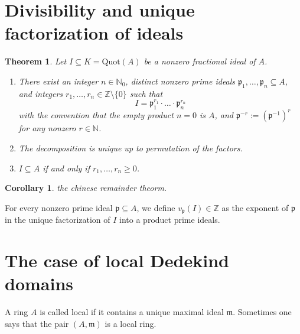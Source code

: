 \documentclass[a4paper]{book}
\theoremstyle{break}
\theoremstyle{plain}
\newtheorem{theorem}{Theorem}[definition]
\newtheorem{corollary}{Corollary}
\begin{document}
\section{Divisibility and unique factorization of ideals}

\begin{theorem}
    Let \(I \subseteq K = \text{Quot}(A)\) be a nonzero fractional ideal of \(A\).
    \begin{enumerate}
        \item There exist an integer \(n \in \mathbb{N}_0\), distinct nonzero prime ideals \(\mathfrak{p}_1, \ldots, \mathfrak{p}_n \subseteq A\), and integers \(r_1, \ldots, r_n \in \mathbb{Z} \setminus \{0\}\) such that
        \begin{equation}
            I = \mathfrak{p}_1^{r_1} \cdot \ldots \cdot \mathfrak{p}_n^{r_n}
        \end{equation}
        with the convention that the empty product \(n = 0\) is \(A\), and \(\mathfrak{p}^{-r} := \left(\mathfrak{p}^{-1}\right)^r\) for any nonzero \(r \in \mathbb{N}\).
        \item The decomposition is unique up to permutation of the factors.
        \item \(I \subseteq A\) if and only if \(r_1, \ldots, r_n \geq 0\).
    \end{enumerate}
\end{theorem}

\begin{corollary}
    the chinese remainder theorm.
\end{corollary}

\begin{definition}
    For every nonzero prime ideal \(\mathfrak{p} \subseteq A\), we define \(v_\mathfrak{p}(I) \in \mathbb{Z}\) as the exponent of \(\mathfrak{p}\) in the unique factorization of \(I\) into a product prime ideals.
\end{definition}

\section{The case of local Dedekind domains}

\begin{definition}
    A ring \(A\) is called local if it contains a unique maximal ideal \(\mathfrak{m}\). Sometimes one says that the pair \((A, \mathfrak{m})\) is a local ring.
\end{definition}
\end{document}
